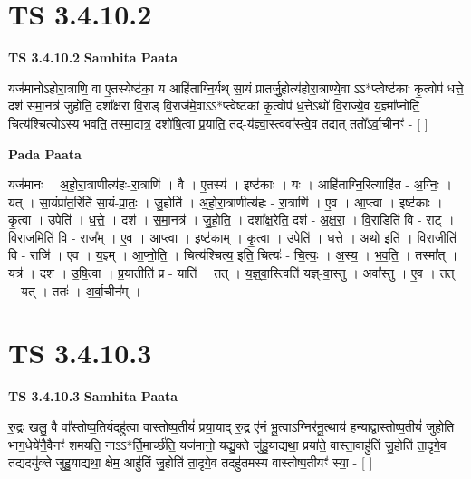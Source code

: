 \documentclass[17pt]{extarticle}
\begin{document}

\section{ TS 3.4.10.2 }

\textbf{TS 3.4.10.2 } \newline
\textbf{Samhita Paata} \newline

यज॑मानोऽहोरा॒त्राणि॒ वा ए॒तस्येष्ट॑का॒ य आहि॑ताग्नि॒र्यथ् सा॒यं प्रा॑तर्जु॒होत्य॑होरा॒त्राण्ये॒वा ऽऽ*प्त्वेष्ट॑काः कृ॒त्वोप॑ धत्ते॒ दश॑ समा॒नत्र॑ जुहोति॒ दशा᳚क्षरा वि॒राड् वि॒राज॑मे॒वाऽऽ*प्त्वेष्ट॑कां कृ॒त्वोप॑ ध॒त्तेऽथो॑ वि॒राज्ये॒व य॒ज्ञ्मा᳚प्नोति॒ चित्य॑श्चित्योऽस्य भवति॒ तस्मा॒द्यत्र॒ दशो॑षि॒त्वा प्र॒याति॒ तद्-य॑ज्ञ्वा॒स्त्ववा᳚स्त्वे॒व तद्यत् ततो᳚ऽर्वा॒चीनꣳ॑ - [  ] \newline

\textbf{Pada Paata} \newline

यज॑मानः । अ॒हो॒रा॒त्राणीत्य॑हः-रा॒त्राणि॑ । वै । ए॒तस्य॑ । इष्ट॑काः । यः । आहि॑ताग्नि॒रित्याहि॑त - अ॒ग्निः॒ । यत् । सा॒यंप्रा॑त॒रिति॑ सा॒यं-प्रा॒तः॒ । जु॒होति॑ । अ॒हो॒रा॒त्राणीत्य॑हः - रा॒त्राणि॑ । ए॒व । आ॒प्त्वा । इष्ट॑काः । कृ॒त्वा । उपेति॑ । ध॒त्ते॒ । दश॑ । स॒मा॒नत्र॑ । जु॒हो॒ति॒ । दशा᳚क्ष॒रेति॒ दश॑ - अ॒क्ष॒रा॒ । वि॒राडिति॑ वि - राट् । वि॒राज॒मिति॑ वि - राज᳚म् । ए॒व । आ॒प्त्वा । इष्ट॑काम् । कृ॒त्वा । उपेति॑ । ध॒त्ते॒ । अथो॒ इति॑ । वि॒राजीति॑ वि - राजि॑ । ए॒व । य॒ज्ञ्म् । आ॒प्नो॒ति॒ । चित्य॑श्चित्य॒ इति॒ चित्यः॑ - चि॒त्यः॒ । अ॒स्य॒ । भ॒व॒ति॒ । तस्मा᳚त् । यत्र॑ । दश॑ । उ॒षि॒त्वा । प्र॒यातीति॑ प्र - याति॑ । तत् । य॒ज्ञ्॒वा॒स्त्विति॑ यज्ञ्-वा॒स्तु । अवा᳚स्तु । ए॒व । तत् । यत् । ततः॑ । अ॒र्वा॒चीन᳚म् ।  \newline





\section{ TS 3.4.10.3 }

\textbf{TS 3.4.10.3 } \newline
\textbf{Samhita Paata} \newline

रु॒द्रः खलु॒ वै वा᳚स्तोष्प॒तिर्यदहु॑त्वा वास्तोष्प॒तीयं॑ प्रया॒याद् रु॒द्र ए॑नं भू॒त्वाऽग्निर॑नू॒त्थाय॑ हन्याद्वास्तोष्प॒तीयं॑ जुहोति भाग॒धेये॑नै॒वैनꣳ॑ शमयति॒ नाऽऽ*र्ति॒मार्च्छ॑ति॒ यज॑मानो॒ यद्यु॒क्ते जु॑हु॒याद्यथा॒ प्रया॑ते॒ वास्ता॒वाहु॑तिं जु॒होति॑ ता॒दृगे॒व तद्यदयु॑क्ते जुहु॒याद्यथा॒ क्षेम॒ आहु॑तिं जु॒होति॑ ता॒दृगे॒व तदहु॑तमस्य वास्तोष्प॒तीयꣳ॑ स्या॒ - [  ] \newline
\end{document}
